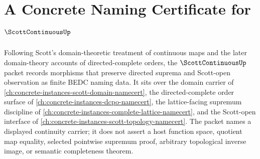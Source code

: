 \chapter{A Concrete Naming Certificate for $\ScottContinuousUp$}
\label{ch:concrete-instances-scott-continuous-namecert}

Following Scott's domain-theoretic treatment of continuous maps and the later domain-theory accounts of directed-complete orders, the $\ScottContinuousUp$ packet records morphisms that preserve directed suprema and Scott-open observation as finite BEDC naming data. It sits over the domain carrier of \autoref{ch:concrete-instances-scott-domain-namecert}, the directed-complete order surface of \autoref{ch:concrete-instances-dcpo-namecert}, the lattice-facing supremum discipline of \autoref{ch:concrete-instances-complete-lattice-namecert}, and the Scott-open interface of \autoref{ch:concrete-instances-scott-topology-namecert}. The packet names a displayed continuity carrier; it does not assert a host function space, quotient map equality, selected pointwise supremum proof, arbitrary topological inverse image, or semantic completeness theorem.

